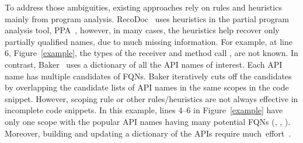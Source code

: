 

To address those ambiguities,
existing approaches rely on rules and heuristics mainly from
program analysis. 
%
%
RecoDoc~\cite{dagenais-icse12} uses heuristics in the partial program analysis tool,
PPA~\cite{dagenais-oopsla08}, 
however, in many cases, the heuristics help recover only partially
qualified names, due to much missing information. For example, at line
6, Figure~\ref{example}, the types of the receiver  and
method call , are not known. In contrast,
Baker~\cite{liveapi14} uses a dictionary of all the API names of
interest. Each API name has multiple candidates of FQNs. Baker
iteratively cuts off the candidates by overlapping the candidate lists
of API names in the same scopes in the code snippet. However, scoping
rule or other rules/heuristics are not always effective in incomplete
code snippets. In this example, lines 4--6 in Figure~\ref{example}
have only one scope with the popular API names having many potential
FQNs (, , ). Moreover,
building and updating a dictionary of the APIs require
much~effort~\cite{dagenais-fse10}.


%
%
%

